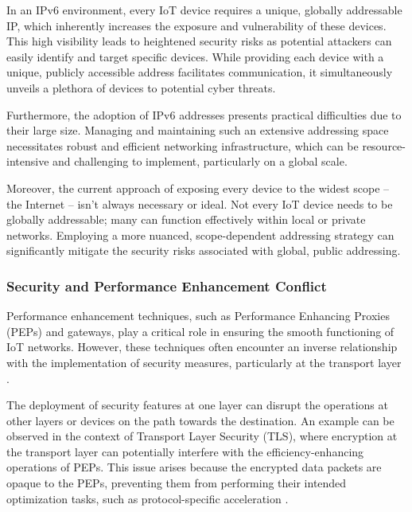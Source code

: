 \documentclass{ieeeaccess}
\begin{document}
In an IPv6 environment, every IoT device requires a unique, globally addressable IP, which inherently increases the exposure and vulnerability of these devices. This high visibility leads to heightened security risks as potential attackers can easily identify and target specific devices. While providing each device with a unique, publicly accessible address facilitates communication, it simultaneously unveils a plethora of devices to potential cyber threats.

Furthermore, the adoption of IPv6 addresses presents practical difficulties due to their large size. Managing and maintaining such an extensive addressing space necessitates robust and efficient networking infrastructure, which can be resource-intensive and challenging to implement, particularly on a global scale.

Moreover, the current approach of exposing every device to the widest scope -- the Internet -- isn't always necessary or ideal. Not every IoT device needs to be globally addressable; many can function effectively within local or private networks. Employing a more nuanced, scope-dependent addressing strategy can significantly mitigate the security risks associated with global, public addressing.
	
\subsubsection{Security and Performance Enhancement Conflict}
Performance enhancement techniques, such as Performance Enhancing Proxies (PEPs) and gateways, play a critical role in ensuring the smooth functioning of IoT networks. However, these techniques often encounter an inverse relationship with the implementation of security measures, particularly at the transport layer \cite{peymanICC16, in-net-res-pool}.

The deployment of security features at one layer can disrupt the operations at other layers or devices on the path towards the destination. An example can be observed in the context of Transport Layer Security (TLS), where encryption at the transport layer can potentially interfere with the efficiency-enhancing operations of PEPs. This issue arises because the encrypted data packets are opaque to the PEPs, preventing them from performing their intended optimization tasks, such as protocol-specific acceleration \cite{7005393}.
	
\end{document}
